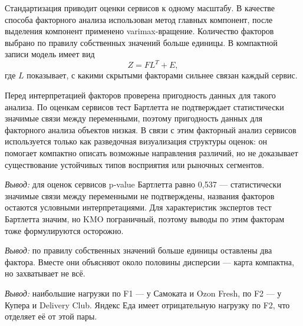 \documentclass[14pt,a4paper]{extarticle}
\newcommand{\miniresult}[1]{%
    \par\vspace{0.30\baselineskip}%
    \noindent\textit{Вывод:} #1%
    \par\vspace{0.25\baselineskip}%
}
\begin{document}
Стандартизация приводит оценки сервисов к одному масштабу. В качестве способа факторного анализа использован метод главных компонент, после выделения компонент применено varimax-вращение. Количество факторов выбрано по правилу собственных значений больше единицы. В компактной записи модель имеет вид
\begin{equation}
Z=FL^{T}+E,
\end{equation}
где $L$ показывает, с какими скрытыми факторами сильнее связан каждый сервис.

Перед интерпретацией факторов проверена пригодность данных для такого анализа. По оценкам сервисов тест Бартлетта не подтверждает статистически значимые связи между переменными, поэтому пригодность данных для факторного анализа объектов низкая. В связи с этим факторный анализ сервисов используется только как разведочная визуализация структуры оценок: он помогает компактно описать возможные направления различий, но не доказывает существование устойчивых типов восприятия или рыночных сегментов.

\begin{table}[H]
\centering
\caption{Проверка пригодности данных для факторного анализа}
\label{tab:factor_suitability}

\end{table}
\miniresult{для оценок сервисов p-value Бартлетта равно 0,537 — статистически значимые связи между переменными не подтверждены, названия факторов остаются условными интерпретациями. Для характеристик экспертов тест Бартлетта значим, но KMO пограничный, поэтому выводы по этим факторам тоже формулируются осторожно.}

\begin{table}[H]
\centering
\caption{Собственные значения факторов для оцениваемых объектов}
\label{tab:object_eigen}

\end{table}
\miniresult{по правилу собственных значений больше единицы оставлены два фактора. Вместе они объясняют около половины дисперсии — карта компактна, но захватывает не всё.}

\begin{table}[H]
\centering
\caption{Факторные нагрузки оцениваемых объектов после varimax-вращения}
\label{tab:object_loadings}

\end{table}
\miniresult{наибольшие нагрузки по F1 — у Самоката и Ozon Fresh, по F2 — у Купера и Delivery Club. Яндекс Еда имеет отрицательную нагрузку по F2, что отделяет её от этой пары.}
\end{document}
